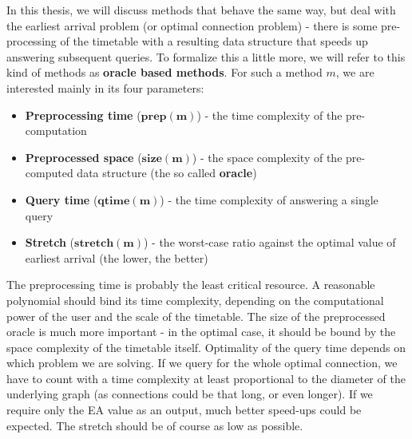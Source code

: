 	In this thesis, we will discuss methods that behave the same way, but deal with the earliest arrival problem (or optimal connection problem) - there is some pre-processing of the timetable with a resulting data structure that speeds up answering subsequent queries. To formalize this a little more, we will refer to this kind of methods as \textbf{oracle based methods}. For such a method $m$, we are interested mainly in its four parameters:
	\begin{itemize}
		\item \textbf{Preprocessing time} ($\bm{prep(m)}$) - the time complexity of the pre-computation
		\item \textbf{Preprocessed space} ($\bm{size(m)}$) - the space complexity of the pre-computed data structure (the so called \textbf{oracle})
		\item \textbf{Query time} ($\bm{qtime(m)}$) - the time complexity of answering a single query
		\item \textbf{Stretch} ($\bm{stretch(m)}$) - the worst-case ratio against the optimal value of earliest arrival (the lower, the better)
	\end{itemize}
	\hspace*{\fill}
	
	\noindent The preprocessing time is probably the least critical resource. A reasonable polynomial should bind its time complexity, depending on the computational power of the user and the scale of the timetable. The size of the preprocessed oracle is much more important - in the optimal case, it should be bound by the space complexity of the timetable itself. Optimality of the query time depends on which problem we are solving. If we query for the whole optimal connection, we have to count with a time complexity at least proportional to the diameter of the underlying graph (as connections could be that long, or even longer). If we require only the EA value as an output, much better speed-ups could be expected. The stretch should be of course as low as possible.